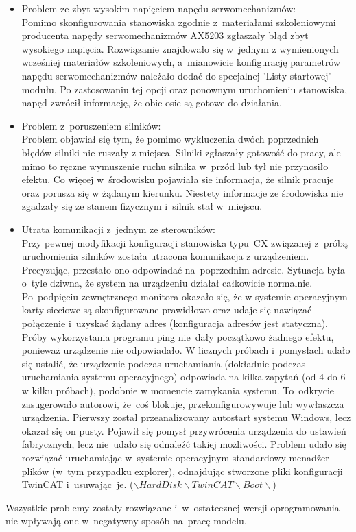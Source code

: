 \begin{itemize}
\item Problem ze zbyt wysokim napięciem napędu serwomechanizmów:\\[1mm]
Pomimo skonfigurowania stanowiska zgodnie z~materiałami szkoleniowymi producenta \cite{kurs2, silniki} napędy serwomechanizmów AX5203 zgłaszały błąd zbyt wysokiego napięcia. Rozwiązanie znajdowało się w~jednym z wymienionych wcześniej materiałów szkoleniowych, a~mianowicie konfigurację parametrów napędu serwomechanizmów należało dodać do specjalnej 'Listy startowej' modułu. Po zastosowaniu tej opcji oraz ponownym uruchomieniu stanowiska, napęd zwrócił informację, że obie osie są gotowe do działania.

\item Problem z~poruszeniem silników:\\[1mm]
Problem objawiał się tym, że pomimo wykluczenia dwóch poprzednich błędów silniki nie ruszały z miejsca. Silniki zgłaszały gotowość do pracy, ale mimo to ręczne wymuszenie ruchu silnika w~przód lub tył nie przynosiło efektu. Co więcej w~środowisku pojawiała sie informacja, że silnik pracuje oraz porusza się w żądanym kierunku. Niestety informacje ze środowiska nie zgadzały się ze stanem fizycznym i~silnik stał w~miejscu.

\item Utrata komunikacji z~jednym ze sterowników:\\[1mm]
Przy pewnej modyfikacji konfiguracji stanowiska typu~CX związanej z~próbą uruchomienia silników została utracona komunikacja z urządzeniem. Precyzując, przestało ono odpowiadać na~poprzednim adresie. Sytuacja była o~tyle dziwna, że system na urządzeniu działał całkowicie normalnie. Po~podpięciu zewnętrznego monitora okazało się, że w systemie operacyjnym karty sieciowe są skonfigurowane prawidłowo oraz udaje się nawiązać połączenie i~uzyskać żądany adres (konfiguracja adresów jest statyczna). Próby wykorzystania programu ping nie~dały początkowo żadnego efektu, ponieważ urządzenie nie odpowiadało. W licznych próbach i~pomysłach udało się ustalić, że urządzenie podczas uruchamiania (dokładnie podczas uruchamiania systemu operacyjnego) odpowiada na kilka zapytań (od 4 do 6 w kilku próbach), podobnie w momencie zamykania systemu. To~odkrycie zasugerowało autorowi, że~coś blokuje, przekonfigurowywuje lub wywłaszcza urządzenia. Pierwszy został przeanalizowany autostart systemu Windows, lecz okazał się on pusty. Pojawił się pomysł przywrócenia urządzenia do ustawień fabrycznych, lecz nie~udało się odnaleźć takiej możliwości. Problem udało się rozwiązać uruchamiając w~systemie operacyjnym standardowy menadżer plików (w~tym przypadku explorer), odnajdując stworzone pliki konfiguracji TwinCAT i~usuwając~je. ($\backslash Hard Disk\backslash TwinCAT\backslash Boot\backslash$)

\end{itemize}
\indent
\indent Wszystkie problemy zostały rozwiązane i~w~ostatecznej wersji oprogramowania nie wpływają one w~negatywny sposób na~pracę modelu.

